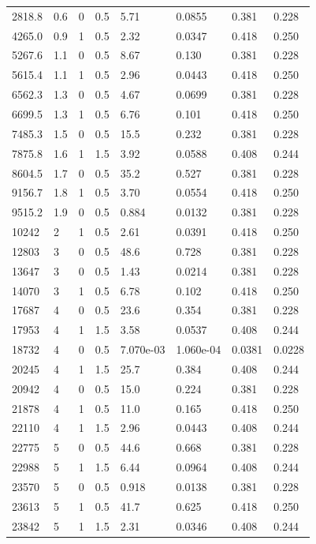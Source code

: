 \documentclass[preview]{standalone}
\begin{document}
{{\begin{tabular}{L{1.2cm}C{1.2cm} C{0.3cm}C{0.5cm} C{1.4cm}C{1.4cm} C{1.4cm}C{1.4cm}}
  2818.8  &   0.6  & 0     & 0.5 &  5.71  & 0.0855  & 0.381 &  0.228   \\ 
  4265.0  &   0.9  & 1     & 0.5 &  2.32  & 0.0347  & 0.418 &  0.250   \\ 
  5267.6  &   1.1  & 0     & 0.5 &  8.67  & 0.130  & 0.381 &  0.228   \\ 
  5615.4  &   1.1  & 1     & 0.5 &  2.96  & 0.0443  & 0.418 &  0.250   \\ 
  6562.3  &   1.3  & 0     & 0.5 &  4.67  & 0.0699  & 0.381 &  0.228   \\ 
  6699.5  &   1.3  & 1     & 0.5 &  6.76  & 0.101  & 0.418 &  0.250   \\ 
  7485.3  &   1.5  & 0     & 0.5 &  15.5  & 0.232  & 0.381 &  0.228   \\ 
  7875.8  &   1.6  & 1     & 1.5 &  3.92  & 0.0588  & 0.408 &  0.244   \\ 
  8604.5  &   1.7  & 0     & 0.5 &  35.2  & 0.527  & 0.381 &  0.228   \\ 
  9156.7  &   1.8  & 1     & 0.5 &  3.70  & 0.0554  & 0.418 &  0.250   \\ 
  9515.2  &   1.9  & 0     & 0.5 &  0.884  & 0.0132  & 0.381 &  0.228   \\ 
  10242  &     2  & 1     & 0.5 &  2.61  & 0.0391  & 0.418 &  0.250   \\ 
  12803  &     3  & 0     & 0.5 &  48.6  & 0.728  & 0.381 &  0.228   \\ 
  13647  &     3  & 0     & 0.5 &  1.43  & 0.0214  & 0.381 &  0.228   \\ 
  14070  &     3  & 1     & 0.5 &  6.78  & 0.102  & 0.418 &  0.250   \\ 
  17687  &     4  & 0     & 0.5 &  23.6  & 0.354  & 0.381 &  0.228   \\ 
  17953  &     4  & 1     & 1.5 &  3.58  & 0.0537  & 0.408 &  0.244   \\ 
  18732  &     4  & 0     & 0.5 &  7.070e-03  & 1.060e-04  & 0.0381 &  0.0228   \\ 
  20245  &     4  & 1     & 1.5 &  25.7  & 0.384  & 0.408 &  0.244   \\ 
  20942  &     4  & 0     & 0.5 &  15.0  & 0.224  & 0.381 &  0.228   \\ 
  21878  &     4  & 1     & 0.5 &  11.0  & 0.165  & 0.418 &  0.250   \\ 
  22110  &     4  & 1     & 1.5 &  2.96  & 0.0443  & 0.408 &  0.244   \\ 
  22775  &     5  & 0     & 0.5 &  44.6  & 0.668  & 0.381 &  0.228   \\ 
  22988  &     5  & 1     & 1.5 &  6.44  & 0.0964  & 0.408 &  0.244   \\ 
  23570  &     5  & 0     & 0.5 &  0.918  & 0.0138  & 0.381 &  0.228   \\ 
  23613  &     5  & 1     & 0.5 &  41.7  & 0.625  & 0.418 &  0.250   \\ 
  23842  &     5  & 1     & 1.5 &  2.31  & 0.0346  & 0.408 &  0.244   \\ 
\hline 
\end{tabular} 

}}
\end{document}
